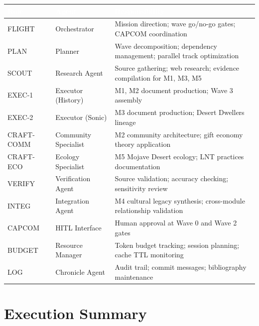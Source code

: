 \documentclass[11pt,letterpaper]{article}
\newcommand{\tableheader}[1]{\textbf{\sffamily\textcolor{white}{#1}}}
\begin{document}
\begin{center}
\begin{tabularx}{\textwidth}{L{2cm}L{3cm}X}
\toprule
{}
\tableheader{Role} & \tableheader{Agent} & \tableheader{Responsibility} \\
\midrule
FLIGHT & Orchestrator & Mission direction; wave go/no-go gates; CAPCOM coordination \\
PLAN & Planner & Wave decomposition; dependency management; parallel track optimization \\
SCOUT & Research Agent & Source gathering; web research; evidence compilation for M1, M3, M5 \\
EXEC-1 & Executor (History) & M1, M2 document production; Wave 3 assembly \\
EXEC-2 & Executor (Sonic) & M3 document production; Desert Dwellers lineage \\
CRAFT-COMM & Community Specialist & M2 community architecture; gift economy theory application \\
CRAFT-ECO & Ecology Specialist & M5 Mojave Desert ecology; LNT practices documentation \\
VERIFY & Verification Agent & Source validation; accuracy checking; sensitivity review \\
INTEG & Integration Agent & M4 cultural legacy synthesis; cross-module relationship validation \\
CAPCOM & HITL Interface & Human approval at Wave 0 and Wave 2 gates \\
BUDGET & Resource Manager & Token budget tracking; session planning; cache TTL monitoring \\
LOG & Chronicle Agent & Audit trail; commit messages; bibliography maintenance \\
\bottomrule
\end{tabularx}
\end{center}

\section{Execution Summary}
\end{document}

